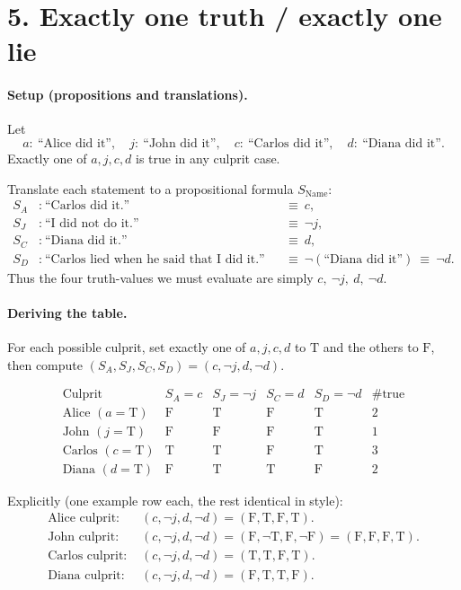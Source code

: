 \section*{5. Exactly one truth / exactly one lie}

\paragraph{Setup (propositions and translations).}
Let
\[
a:\ \text{``Alice did it''},\quad
j:\ \text{``John did it''},\quad
c:\ \text{``Carlos did it''},\quad
d:\ \text{``Diana did it''}.
\]
Exactly one of $a,j,c,d$ is true in any culprit case.

Translate each statement to a propositional formula $S_\text{Name}$:
\[
\begin{aligned}
S_A &:\ \text{``Carlos did it.''} &&\equiv\ c,\\
S_J &:\ \text{``I did not do it.''} &&\equiv\ \lnot j,\\
S_C &:\ \text{``Diana did it.''} &&\equiv\ d,\\
S_D &:\ \text{``Carlos lied when he said that I did it.''} 
     &&\equiv\ \lnot(\text{``Diana did it''})\ \equiv\ \lnot d.
\end{aligned}
\]
Thus the four truth-values we must evaluate are simply $c,\ \lnot j,\ d,\ \lnot d$.

\paragraph{Deriving the table.}
For each possible culprit, set exactly one of $a,j,c,d$ to $\mathrm{T}$ and the others to $\mathrm{F}$, then
compute $(S_A,S_J,S_C,S_D)=(c,\lnot j,d,\lnot d)$.

\[
\begin{array}{c|cccc|c}
\text{Culprit} & S_A=c & S_J=\lnot j & S_C=d & S_D=\lnot d & \#\text{true} \\
\hline
\text{Alice }(a{=}\mathrm{T})  & \mathrm{F} & \mathrm{T} & \mathrm{F} & \mathrm{T} & 2\\
\text{John }(j{=}\mathrm{T})   & \mathrm{F} & \mathrm{F} & \mathrm{F} & \mathrm{T} & 1\\
\text{Carlos }(c{=}\mathrm{T}) & \mathrm{T} & \mathrm{T} & \mathrm{F} & \mathrm{T} & 3\\
\text{Diana }(d{=}\mathrm{T})  & \mathrm{F} & \mathrm{T} & \mathrm{T} & \mathrm{F} & 2
\end{array}
\]

Explicitly (one example row each, the rest identical in style):
\[
\begin{aligned}
\text{Alice culprit: } & (c,\lnot j,d,\lnot d)=(\mathrm{F},\mathrm{T},\mathrm{F},\mathrm{T}).\\
\text{John culprit: }  & (c,\lnot j,d,\lnot d)=(\mathrm{F},\lnot \mathrm{T},\mathrm{F},\lnot \mathrm{F})=(\mathrm{F},\mathrm{F},\mathrm{F},\mathrm{T}).\\
\text{Carlos culprit: }& (c,\lnot j,d,\lnot d)=(\mathrm{T},\mathrm{T},\mathrm{F},\mathrm{T}).\\
\text{Diana culprit: } & (c,\lnot j,d,\lnot d)=(\mathrm{F},\mathrm{T},\mathrm{T},\mathrm{F}).
\end{aligned}
\]

